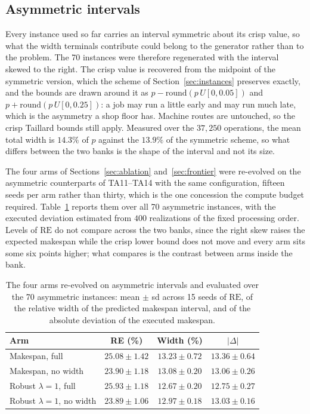 \documentclass[review,authoryear,11pt]{elsarticle}
\newcommand{\rev}[1]{\textcolor{revcolor}{#1}}
\newcommand{\RE}{\mathrm{RE}}
\begin{document}
\subsection{Asymmetric intervals}
\label{sec:asym}

\rev{Every instance used so far carries an interval symmetric about its
crisp value, so what the width terminals contribute could belong to the
generator rather than to the problem. The 70 instances were therefore
regenerated with the interval skewed to the right. The crisp value is
recovered from the midpoint of the symmetric version, which the scheme
of Section~\ref{sec:instances} preserves exactly, and the bounds are
drawn around it as $p - \mathrm{round}(p\,U[0,0.05])$ and
$p + \mathrm{round}(p\,U[0,0.25])$: a job may run a little early and may
run much late, which is the asymmetry a shop floor has. Machine routes
are untouched, so the crisp Taillard bounds still apply. Measured over
the $37{,}250$ operations, the mean total width is $14.3\%$ of $p$
against the $13.9\%$ of the symmetric scheme, so what differs between
the two banks is the shape of the interval and not its size.}

\rev{The four arms of Sections~\ref{sec:ablation}
and~\ref{sec:frontier} were re-evolved on the asymmetric counterparts of
TA11--TA14 with the same configuration, fifteen seeds per arm rather
than thirty, which is the one concession the compute budget required.
Table~\ref{tab:asym} reports them over all 70 asymmetric instances,
with the executed deviation estimated from $400$ realizations of the
fixed processing order. Levels of $\RE$ do not compare across the two
banks, since the right skew raises the expected makespan while the
crisp lower bound does not move and every arm sits some six points
higher; what compares is the contrast between arms inside the bank.}

\begin{table}[t]
\centering\small
\color{revcolor}
\caption{\rev{The four arms re-evolved on asymmetric intervals and
evaluated over the 70 asymmetric instances: mean $\pm$ sd across 15
seeds of $\RE$, of the relative width of the predicted makespan
interval, and of the absolute deviation of the executed makespan.}}
\label{tab:asym}
\begin{tabular}{lccc}
\toprule
Arm & RE (\%) & Width (\%) & $|\Delta|$ \\
\midrule
Makespan, full & $25.08 \pm 1.42$ & $13.23 \pm 0.72$ & $13.36 \pm 0.64$ \\
Makespan, no width & $23.90 \pm 1.18$ & $13.08 \pm 0.20$ &
$13.06 \pm 0.26$ \\
Robust $\lambda{=}1$, full & $25.93 \pm 1.18$ & $12.67 \pm 0.20$ &
$12.75 \pm 0.27$ \\
Robust $\lambda{=}1$, no width & $23.89 \pm 1.06$ & $12.97 \pm 0.18$ &
$13.03 \pm 0.16$ \\
\bottomrule
\end{tabular}
\end{table}
\end{document}
